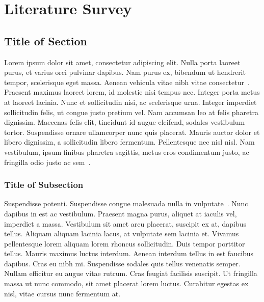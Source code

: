 
\chapter{Literature Survey}

\lipsum[1]

\section{Title of Section}

Lorem ipsum dolor sit amet, consectetur adipiscing elit. Nulla porta laoreet purus, et varius orci pulvinar dapibus. Nam purus ex, bibendum ut hendrerit tempor, scelerisque eget massa. Aenean vehicula vitae nibh vitae consectetur~\cite{ErdelyiBook}. Praesent maximus laoreet lorem, id molestie nisi tempus nec. Integer porta metus at laoreet lacinia. Nunc et sollicitudin nisi, ac scelerisque urna. Integer imperdiet sollicitudin felis, ut congue justo pretium vel. Nam accumsan leo at felis pharetra dignissim. Maecenas felis elit, tincidunt id augue eleifend, sodales vestibulum tortor. Suspendisse ornare ullamcorper nunc quis placerat. Mauris auctor dolor et libero dignissim, a sollicitudin libero fermentum. Pellentesque nec nisl nisl. Nam vestibulum, ipsum finibus pharetra sagittis, metus eros condimentum justo, ac fringilla odio justo ac sem~\cite{ErdelyiBook,JakesBook,ExtonBook}.

\lipsum[2-3]

\subsection{Title of Subsection}
\lipsum[1]

Suspendisse potenti. Suspendisse congue malesuada nulla in vulputate~\cite{SrivastavaBook,PrudnikovBookv4}. Nunc dapibus in est ac vestibulum. Praesent magna purus, aliquet at iaculis vel, imperdiet a massa. Vestibulum sit amet arcu placerat, suscipit ex at, dapibus tellus. Aliquam aliquam lacinia lacus, at vulputate sem lacinia et. Vivamus pellentesque lorem aliquam lorem rhoncus sollicitudin. Duis tempor porttitor tellus. Mauris maximus luctus interdum\cite{LeeBook1998,RyzhikBook,Hoyt-1947Probability}. Aenean interdum tellus in est faucibus dapibus. Cras eu nibh mi. Suspendisse sodales quis tellus venenatis semper. Nullam efficitur eu augue vitae rutrum. Cras feugiat facilisis suscipit. Ut fringilla massa ut nunc commodo, sit amet placerat lorem luctus. Curabitur egestas ex nisl, vitae cursus nunc fermentum at.
